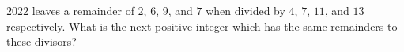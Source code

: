 $2022$ leaves a remainder of $2$, $6$, $9$, and $7$ when divided by $4$, $7$, $11$, and $13$ respectively. What is the next positive integer which has the same remainders to these divisors?
